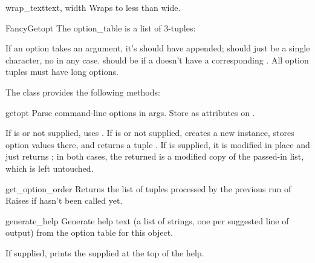 \documentclass{manual}
\begin{document}
\begin{funcdesc}{wrap_text}{text, width}
Wraps  to less than  wide.

\end{funcdesc}

\begin{classdesc}{FancyGetopt}{}
The option_table is a list of 3-tuples: 

If an option takes an argument, it's  should have 
appended;  should just be a single character, no 
in any case.  should be  if a  
doesn't have a corresponding . All option tuples must have
long options.
\end{classdesc}

The  class provides the following methods:

\begin{methoddesc}{getopt}{}
Parse command-line options in args. Store as attributes on .

If  is  or not supplied, uses .  If
 is  or not supplied, creates a new 
instance, stores option values there, and returns a tuple .  If  is supplied, it is modified in place and
 just returns ; in both cases, the returned
 is a modified copy of the passed-in  list, which
is left untouched.
\end{methoddesc}

\begin{methoddesc}{get_option_order}{}
Returns the list of  tuples processed by the
previous run of   Raises  if
 hasn't been called yet.
\end{methoddesc}

\begin{methoddesc}{generate_help}{}
Generate help text (a list of strings, one per suggested line of
output) from the option table for this  object.

If supplied, prints the supplied  at the top of the help.
\end{methoddesc}
\end{document}
